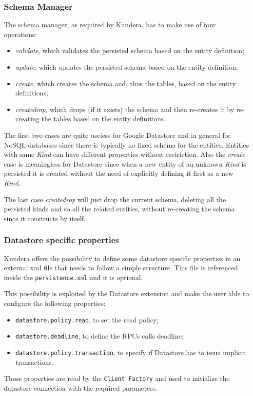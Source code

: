 \subsubsection{Schema Manager}
The schema manager, as required by Kundera, has to make use of four operations:
\begin{itemize}
\item \textit{validate}, which validates the persisted schema based on the entity definition;
\item \textit{update}, which updates the persisted schema based on the entity definition;
\item \textit{create}, which creates the schema and, thus the tables, based on the entity definitions;
\item \textit{create\textunderscore drop}, which drops (if it exists) the schema and then re-creates it by re-creating the tables based on the entity definitions.
\end{itemize}

\noindent The first two cases are quite useless for Google Datastore and in general for NoSQL databases since there is typically no fixed schema for the entities. Entities with same \textit{Kind} can have different properties without restriction.
Also the \textit{create} case is meaningless for Datastore since when a new entity of an unknown \textit{Kind} is persisted it is created without the need of explicitly defining it first as a new \textit{Kind}.

\noindent The last case \textit{create\textunderscore drop} will just drop the current schema, deleting all the persisted kinds and so all the related entities, without re-creating the schema since it constructs by itself.

\subsubsection{Datastore specific properties}
Kundera offers the possibility to define some datastore specific properties in an external xml file that needs to follow a simple structure. This file is referenced inside the \texttt{persistence.xml} and it is optional.

\newparagraph This possibility is exploited by the Datastore extension and make the user able to configure the following properties:
\begin{itemize}
\item \texttt{datastore.policy.read}, to set the read policy;
\item \texttt{datastore.deadline}, to define the RPCs calls deadline;
\item \texttt{datastore.policy.transaction}, to specify if Datastore has to issue implicit transactions.
\end{itemize}
Those properties are read by the \texttt{Client Factory} and used to initialize the datastore connection with the required parameters.

